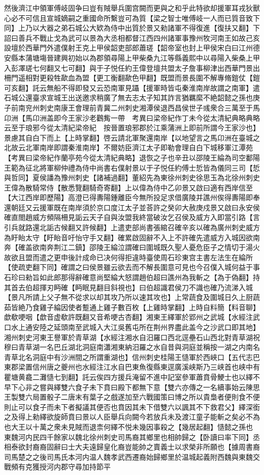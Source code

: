 然後濟江中領軍傅岐固争曰豈有賊舉兵圍宫闕而更與之和乎此特欲却援軍耳戎狄獸心必不可信且宣城嫡嗣之重國命所繫豈可為質【梁之智士唯傅岐一人而已質音致下同】上乃以大器之弟石城公大欵為侍中出質於景又勑諸軍不得復進【復扶又翻】下詔曰善兵不戰止戈為武可以景為大丞相都督江西四州諸軍事豫州牧河南王如故己亥設壇於西華門外遣僕射王克上甲侯韶吏部郎蕭瑳【韶帝室也封上甲侯宋白曰江州德安縣本蒲塘塲晉建興初始以為郡領尋陽上甲柴桑九江等縣義熙中以尋陽入柴桑上甲入彭凙瑳七何翻又七可翻】與于子悦任約王偉登壇共盟太子詹事柳津出西華門景出柵門遥相對更殺牲歃血為盟【更工衡翻歃色甲翻】既盟而景長圍不解專脩鎧仗【鎧可亥翻】託云無船不得即發又云恐南軍見躡【援軍時皆屯秦淮南岸故謂之南軍】遣石城公還臺求宣城王出送邀求稍廣了無去志太子知其詐言猶羈縻不絶韶懿之孫也庚子前南兖州刺史南康王會理前青冀二州刺史湘潭侯退西昌侯世子彧衆合三萬至于馬卬洲【馬卬洲盖即今王家沙老鸛觜一帶　考異曰梁帝紀作丁未今從太清紀典略典略云至于琅邪今從太清紀梁帝紀　按晉置琅邪郡於江乘蒲洲上即前所謂今王家沙也】景慮其自白下而上【上時掌翻】啓云請北軍聚還南岸【以地望言之馬卬洲在臺城之北故云北軍南岸即謂秦淮南岸】不爾妨臣濟江太子即勒會理自白下城移軍江潭苑　【考異曰梁帝紀作蘭亭苑今從太清紀典略】退恢之子也辛丑以邵陵王綸為司空鄱陽王範為征北將軍柳仲禮為侍中尚書右僕射景以于子悦任約傅士悊皆為儀同三司【悊與哲同】夏侯譒為豫州刺史【諸補過翻】董紹先為東徐州刺史徐思玉為北徐州刺史王偉為散騎常侍【散悉覽翻騎奇寄翻】上以偉為侍中乙卯景又啟曰適有西岸信至【大江西岸即歷陽】高澄已得夀陽鍾離臣今無所投足求借廣陵并譙州俟得夀陽即奉還朝廷又云援軍既在南岸須於京口度江太子並荅許之癸卯大赦庚戍景又啟曰永安侯確直閤趙威方頻隔柵見詬云天子自與汝盟我終當破汝乞召侯及威方入即當引路【言引兵就路還北詬古候翻又許候翻】上遣吏部尚書張綰召確辛亥以確為廣州刺史威方為盱眙太守【盱眙音吁怡守手又翻】確累啟固辭不入上不許確先遣威方入城因欲南奔【確盖欲南奔荆江二鎮】邵陵王綸泣謂確曰圍城既久聖人憂危臣子之情切于湯火故欲且盟而遣之更申後計成命已决何得拒違時臺使周石珍東宫主書左法生在綸所【使疏吏翻下同】確謂之曰侯景雖云欲去而不解長圍意可見也今召僕入城何益于事石珍曰勑旨如此郎那得辭確意尚堅綸大怒謂趙伯超曰譙州為我斬之【為于偽翻】持其首去伯超揮刃眄確【眄眠見翻目斜視也】曰伯超識君侯刀不識也確乃流涕入城【景凡所請上父子無不從求以却其攻乃所以速其攻也】上常蔬食及圍城日久上厨蔬茹皆絶乃食雞子綸因使者蹔通上雞子數百枚【上雞時掌翻】上時自料簡【料音聊】歔欷哽咽【歔音虚欷許既翻又音希哽古杏翻】湘東王繹軍於郢州之武城【水經注武口水上通安陸之延頭南至武城入大江吳舊屯所在荆州界盡此盖今之沙武口即其地】湘州刺史河東王譽軍於青草湖【水經注湘水自汨羅口西北逕壘石山西北對青草湖祝穆曰青草湖一名巴丘湖北洞庭南瀟湘東納汨羅之水自昔與洞庭並稱按一湖之内南名青草北名洞庭中有沙洲間之所謂重湖也】信州刺史桂陽王慥軍於西峽口【五代志巴東郡梁置信州唐之夔州也水經注江水自巴東魚復縣東逕廣溪峡斯乃三峡首也峡中有瞿塘黄龕二灘慥七到翻】託云俟四方援兵淹留不進中記室參軍蕭賁骨鯁士也以繹不早下心非之嘗與繹雙六食子未下賁曰殿下都無下意【雙六亦傳之一名續事始云陳思王製雙六局置骰子二唐末有葉子之戲遂加至六戰國策曰博之所以貴梟者便則食不便則止可以食子而未下者擬議其便否也賁因其未下借雙六以諷其不下救君父】繹深銜之及得上勑繹欲旋師賁曰景以人臣舉兵向闕今若放兵未及渡江童子能斬之矣必不為也大王以十萬之衆未見賊而退柰何繹不悦未幾因事殺之【幾居起翻】慥懿之孫也　東魏河内民四千餘家以魏北徐州刺史司馬裔其鄉里也相帥歸之【卧讀曰率下同】丞相泰欲封裔裔固辭曰士大夫遠歸皇化裔豈能帥之賣義士以求榮非所願也【據周書裔司馬楚之之後司馬氏本河内温人魏孝武西遷裔始歸鄉里於温城起義附西魏與東魏交戰頻有克獲授河内郡守尋加持節平